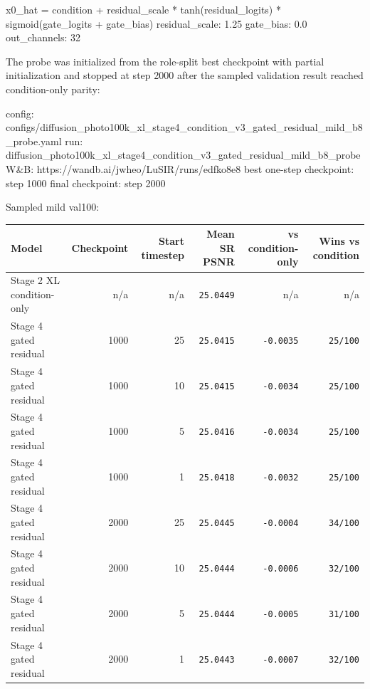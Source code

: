 \documentclass[
  10pt,
]{article}
\newenvironment{Shaded}{}{}
\newcommand{\NormalTok}[1]{#1}
\begin{document}
\begin{Shaded}
\begin{Highlighting}[]
\NormalTok{x0\_hat = condition + residual\_scale * tanh(residual\_logits) * sigmoid(gate\_logits + gate\_bias)}
\NormalTok{residual\_scale: 1.25}
\NormalTok{gate\_bias: 0.0}
\NormalTok{out\_channels: 32}
\end{Highlighting}
\end{Shaded}

The probe was initialized from the role-split best checkpoint with
partial initialization and stopped at step 2000 after the sampled
validation result reached condition-only parity:

\begin{Shaded}
\begin{Highlighting}[]
\NormalTok{config: configs/diffusion\_photo100k\_xl\_stage4\_condition\_v3\_gated\_residual\_mild\_b8\_probe.yaml}
\NormalTok{run: diffusion\_photo100k\_xl\_stage4\_condition\_v3\_gated\_residual\_mild\_b8\_probe}
\NormalTok{W\&B: https://wandb.ai/jwheo/LuSIR/runs/edfko8e8}
\NormalTok{best one{-}step checkpoint: step 1000}
\NormalTok{final checkpoint: step 2000}
\end{Highlighting}
\end{Shaded}

Sampled mild val100:

\begin{longtable}[]{@{}lrrrrr@{}}
\toprule\noalign{}
Model & Checkpoint & Start timestep & Mean SR PSNR & vs condition-only &
Wins vs condition \\
\midrule\noalign{}
\endhead
\bottomrule\noalign{}
\endlastfoot
Stage 2 XL condition-only & n/a & n/a & \texttt{25.0449} & n/a & n/a \\
Stage 4 gated residual & 1000 & 25 & \texttt{25.0415} & \texttt{-0.0035}
& \texttt{25/100} \\
Stage 4 gated residual & 1000 & 10 & \texttt{25.0415} & \texttt{-0.0034}
& \texttt{25/100} \\
Stage 4 gated residual & 1000 & 5 & \texttt{25.0416} & \texttt{-0.0034}
& \texttt{25/100} \\
Stage 4 gated residual & 1000 & 1 & \texttt{25.0418} & \texttt{-0.0032}
& \texttt{25/100} \\
Stage 4 gated residual & 2000 & 25 & \texttt{25.0445} & \texttt{-0.0004}
& \texttt{34/100} \\
Stage 4 gated residual & 2000 & 10 & \texttt{25.0444} & \texttt{-0.0006}
& \texttt{32/100} \\
Stage 4 gated residual & 2000 & 5 & \texttt{25.0444} & \texttt{-0.0005}
& \texttt{31/100} \\
Stage 4 gated residual & 2000 & 1 & \texttt{25.0443} & \texttt{-0.0007}
& \texttt{32/100} \\
\end{longtable}
\end{document}
